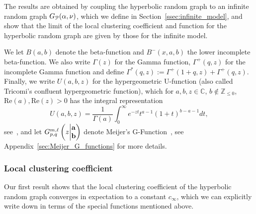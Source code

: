 The results are obtained by coupling the hyperbolic random graph to an infinite random graph $G_\Pcal(\alpha,\nu)$, which we define in Section~\ref{ssec:infinite_model}, and show that the limit of the local clustering coefficient and function for the hyperbolic random graph are given by those for the infinite model. 

We let $B(a,b)$ denote the beta-function and $B^-(x,a,b)$ the lower incomplete beta-function. We also write $\Gamma(z)$ for the Gamma function, $\Gamma^+(q,z)$ for the incomplete Gamma function and define $\Gamma^\ast(q,z) := \Gamma^+(1 + q, z) + \Gamma^+(q, z)$. Finally, we write $U(a,b,z)$ for the hypergeometric U-function (also called Tricomi's confluent hypergeometric function), which for $a,b,z\in \mathbb{C}$, $b \not \in \mathbb{Z}_{\leq 0}$, $\mathrm{Re}(a), \mathrm{Re}(z) >0$ has the integral representation 
\[
	U(a,b,z) = \frac{1}{\Gamma(a)} \int_0^\infty e^{-zt} t^{a-1} (1+t)^{b-a-1} dt,
\] 
see~\cite[p.255 Equation (2)]{erdelyi1953higher}, and let $\MeijerGnew{m}{\ell}{p}{q}{{\bf a}}{{\bf b}}{z}$ denote Meijer's G-Function~\cite{meijer1946gfunction}, see Appendix~\ref{sec:Meijer_G_functions} for more details.

\subsubsection{Local clustering coefficient}

Our first result shows that the local clustering coefficient of the hyperbolic random graph converges in expectation to a constant $c_\infty$, which we can explicitly write down in terms of the special functions mentioned above.

